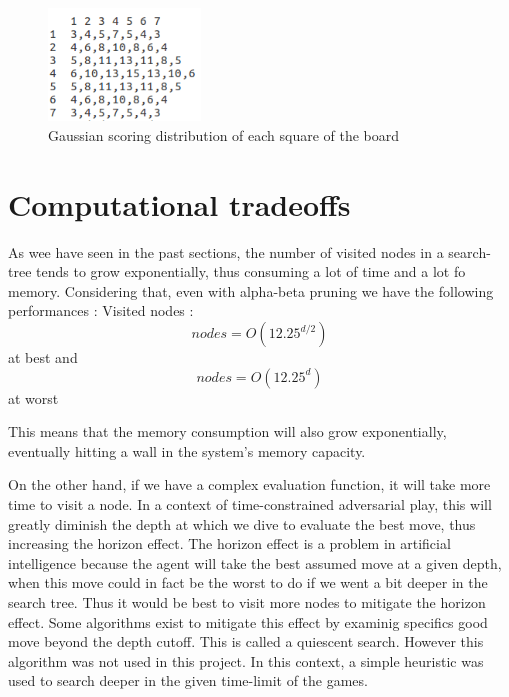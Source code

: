 \documentclass{article}
\begin{document}
	\begin{figure}[!b]
		\hfill\includegraphics[height=3cm]{gauss_distrib.png}\hspace*{\fill}
		\caption{ Gaussian scoring distribution of each square of the board}
		\label{fig:gaussian}
	\end{figure}


\section{Computational tradeoffs}
As wee have seen in the past sections, the number of visited nodes in a search-tree tends to grow exponentially, thus consuming a lot of time and a lot fo memory. Considering that, even with alpha-beta pruning we have the following performances :
Visited nodes :
\[nodes = O(12.25^{d/2}) \] at best and \[nodes = O(12.25^{d}) \] at worst

This means that the memory consumption will also grow exponentially, eventually hitting a wall in the system's memory capacity. 

On the other hand, if we have a complex evaluation function, it will take more time to visit a node. In a context of time-constrained adversarial play, this will greatly diminish the depth at which we dive to evaluate the best move, thus increasing the horizon effect. The horizon effect is a problem in artificial intelligence because the agent will take the best assumed move at a given depth, when this move could in fact be the worst to do if we went a bit deeper in the search tree. Thus it would be best to visit more nodes to mitigate the horizon effect. Some algorithms exist to mitigate this effect by examinig specifics good move beyond the depth cutoff. This is called a quiescent search. However this algorithm was not used in this project. In this context, a simple heuristic was used to search deeper in the given time-limit of the games. 
\end{document}
